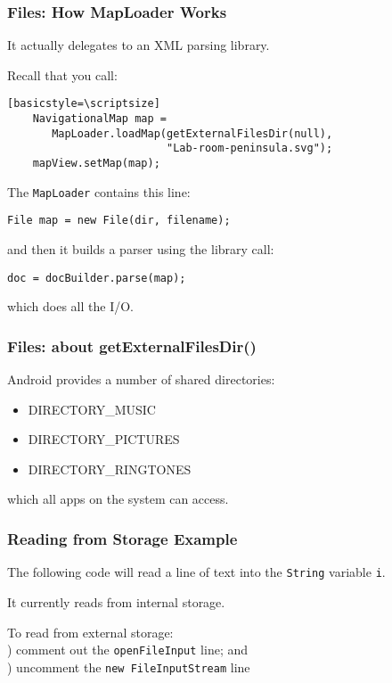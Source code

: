 \begin{frame}[fragile]
\frametitle{Files: How MapLoader Works}
\begin{changemargin}{1cm}
It actually delegates to an XML parsing library. 

Recall that you call:
\begin{verbatim}[basicstyle=\scriptsize]
    NavigationalMap map = 
       MapLoader.loadMap(getExternalFilesDir(null), 
                         "Lab-room-peninsula.svg");
    mapView.setMap(map);
\end{verbatim}

The {\tt MapLoader} contains this line:
\begin{verbatim}
File map = new File(dir, filename);
\end{verbatim}
and then it builds a parser using the library call:
\begin{verbatim}
doc = docBuilder.parse(map);
\end{verbatim}
which does all the I/O.

\end{changemargin}
\end{frame}

\begin{frame}
\frametitle{Files: about getExternalFilesDir()}

\begin{changemargin}{1cm}
Android provides a number of shared directories:
\begin{itemize}
\item DIRECTORY\_MUSIC
\item DIRECTORY\_PICTURES
\item DIRECTORY\_RINGTONES
\end{itemize}
which all apps on the system can access.

\end{changemargin}


\end{frame}

\begin{frame}
\frametitle{Reading from Storage Example}
\begin{changemargin}{1cm}

The following code will read a line of text
into the {\tt String} variable {\tt i}.

It currently reads from internal storage.

To read from external storage: \\
) comment out the {\tt openFileInput} line; and\\
) uncomment the {\tt new FileInputStream} line
\end{changemargin}
\end{frame}


